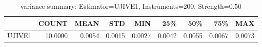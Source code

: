 \begin{table}[ht]
\centering
\caption{variance summary: Estimator=UJIVE1, Instruments=200, Strength=0.50}
\begin{tabular}{lrrrrrrrr}
\toprule
 & COUNT & MEAN & STD & MIN & 25\% & 50\% & 75\% & MAX \\
\midrule
UJIVE1 & 10.0000 & 0.0054 & 0.0015 & 0.0027 & 0.0042 & 0.0055 & 0.0067 & 0.0073 \\
\bottomrule
\end{tabular}
\end{table}
